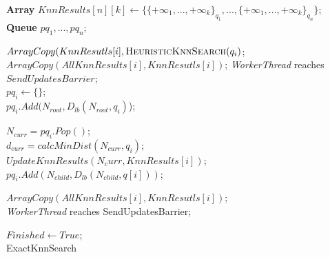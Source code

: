 \small
\begin{algorithm}
	\DontPrintSemicolon
	\vspace{.2cm}
	\textbf{Array} $KnnResults[n][k] \gets \{\{+\infty_{1}, ..., +\infty_{k}\}_{q_{1}}, ..., \{+\infty_{1}, ..., +\infty_{k}\}_{q_{n}}\}$;\\
	\textbf{Queue} $pq_{1}, ..., pq_{n}$;\\
	\vspace{.2cm}
	
	{%
		$ArrayCopy(KnnResutls[i], \text{\sc HeuristicKnnSearch} (q_{i})$;\\
		$ArrayCopy(AllKnnResults[i], KnnResutls[i])$;
	}
 	{\it WorkerThread} reaches $SendUpdatesBarrier$; \\
 	
 	{
 		$pq_i \gets \{\}$;\\
 		$pq_i.Add(N_{root},D_{lb}(N_{root}, q_i)$);\\
 	}
 
 	{
 		{
 			$N_{curr} = pq_{i}.Pop()$;\\
 			{
 				$d_{curr} = calcMinDist(N_{curr}, q_{i})$;\\
 				{
 					$UpdateKnnResults(N_curr, KnnResults[i])$;\\
 				}
 			}
 			\Else
 			{
 				{
 					{
 						$pq_i.Add(N_{child},D_{lb}(N_{child}, q[i]))$;\\	
 					}	
 				}
 			}
 		}

 		{
 			$ArrayCopy(AllKnnResults[i], KnnResutls[i])$;\\	
 		}
 	 	{\it WorkerThread} reaches SendUpdatesBarrier; \\
 	}
 	$Finished \gets True$;\\
	\caption{{\sc ExactKnnSearch}}
	\label{algo:exact_knn_search}
\end{algorithm}

